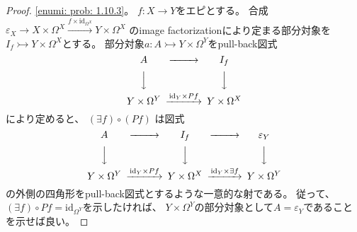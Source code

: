 \documentclass[uplatex]{jsarticle}
\theoremstyle{definition}
\def\ep{\varepsilon}
\def\id{\mathrm{id}}
\newcommand{\rtot}{\rightarrowtail}
\begin{document}
\begin{proof}
  \ref{enumi: prob: 1.10.3}。
  \(f:X\to Y\)をエピとする。
  合成\(\ep_X \to X\times \Omega^X \xrightarrow{f\times \id_{\Omega^X}} Y\times \Omega^X\)
  のimage factorizationにより定まる部分対象を
  \(I_f\rtot Y\times \Omega^X\)とする。
  部分対象\(a:A\rtot Y\times \Omega^Y\)をpull-back図式
  \[
  \begin{CD}
    A @>>> I_f \\
    @VVV @VVV \\
    Y\times \Omega^Y @> \id_Y \times Pf >> Y\times \Omega^X
  \end{CD}
  \]
  により定めると、
  \((\exists f)\circ (Pf)\)
  は図式
  \[
  \begin{CD}
    A @>>> I_f @>>> \ep_Y \\
    @VVV @VVV @VVV \\
    Y\times \Omega^Y @> \id_Y \times Pf >>
    Y\times \Omega^X @> \id_Y \times \exists f >>
    Y\times \Omega^Y
  \end{CD}
  \]
  の外側の四角形をpull-back図式とするような一意的な射である。
  従って、\((\exists f)\circ Pf = \id_{\Omega^Y}\)を示したければ、
  \(Y\times \Omega^Y\)の部分対象として\(A=\ep_Y\)であることを示せば良い。


\end{proof}
\end{document}
